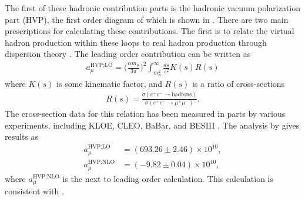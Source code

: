 The first of these hadronic contribution parts is the hadronic vacuum polarization part (HVP), the first order diagram of which is shown in . There are two main prescriptions for calculating these contributions. The first is to relate the virtual hadron production within these loops to real hadron production through dispersion theory \cite{Jeger}. The leading order contribution can be written as 
		\begin{align}
            a_{\mu}^{\text{HVP;LO}} = \Big(\frac{\alpha m_{\mu}}{3\pi}\Big)^{2} \int_{m_{\pi}^{2}}^{\infty} \frac{ds}{s^{2}} K(s) R(s)
		\end{align}
where $K(s)$ is some kinematic factor, and $R(s)$ is a ratio of cross-sections
		\begin{align}
            R(s) = \frac{\sigma(e^{+}e^{-} \rightarrow \text{hadrons})}{\sigma(e^{+}e^{-} \rightarrow \mu^{+}\mu^{-})}.
		\end{align}
The cross-section data for this relation has been measured in parts by various experiments, including KLOE, CLEO, BaBar, and BESIII \cite{KLOE,CLEO,BaBar,BESIII}. The analysis by  gives results as 
		\begin{equation}
		\begin{aligned}
            a_{\mu}^{\text{HVP;LO}} &= (693.26 \pm 2.46) \times 10^{10}, \\
            a_{\mu}^{\text{HVP;NLO}} &= (-9.82 \pm 0.04) \times 10^{10}, 
		\end{aligned}
		\end{equation}
where $a_{\mu}^{\text{HVP;NLO}}$ is the next to leading order calculation. This calculation is consistent with .

